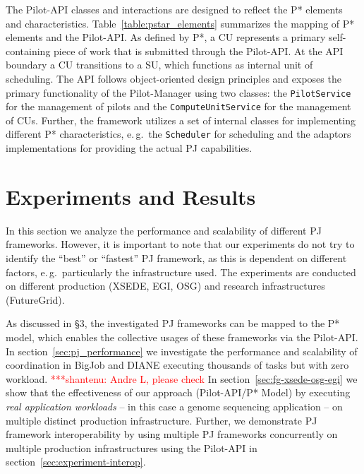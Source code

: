 \documentclass[conference,final]{IEEEtran}
\newcommand{\jhanote}[1]{ {\textcolor{red} { ***shantenu: #1 }}}
\newcommand{\jhanote}[1]{}
\newcommand{\cu}{CU\xspace}
\newcommand{\cus}{CUs\xspace}
\newcommand{\upp}{\vspace*{-0.5em}}
\begin{document}
The Pilot-API classes and interactions are designed to reflect the P*
elements and characteristics.
Table~\ref{table:pstar_elements} summarizes the mapping of P* elements and the
Pilot-API. As defined by P*, a \cu represents a primary self-containing piece
of work that is submitted through the Pilot-API. 
At the API boundary a \cu transitions to a SU, which functions as internal unit
of scheduling.
The API follows object-oriented design principles and exposes the primary
functionality of the Pilot-Manager using two classes: the
\texttt{PilotService} for the management of pilots and the
\texttt{ComputeUnitService} for the management of \cus. 
Further, the framework utilizes a set of internal classes for implementing
different P* characteristics, e.\,g.\ the \texttt{Scheduler} for scheduling and
the adaptors implementations for providing the actual PJ capabilities.


\section{Experiments and Results\upp\upp}
\label{sec:exp_res}

In this section we analyze the performance and scalability of
different PJ frameworks.  However, it is important to note that our
experiments do not try to identify the ``best'' or ``fastest'' PJ
framework, as this is dependent on different factors,
e.\,g.\ particularly the infrastructure used.  The experiments are
conducted on different production (XSEDE, EGI, OSG) and research
infrastructures (FutureGrid). 

As discussed in \S3, the investigated PJ frameworks can be mapped to
the P* model, which enables the collective usages of these frameworks
via the Pilot-API.  In section~\ref{sec:pj_performance} we investigate
the performance and scalability of coordination in BigJob and DIANE
executing thousands of tasks but with zero workload. \jhanote{Andre L,
  please check} In section~\ref{sec:fg-xsede-osg-egi} we show that the
effectiveness of our approach (Pilot-API/P* Model) by executing {\it
  real application workloads} -- in this case a genome sequencing
application -- on multiple distinct production infrastructure.
Further, we demonstrate PJ framework interoperability by using
multiple PJ frameworks concurrently on multiple production
infrastructures using the Pilot-API in section~\ref{sec:experiment-interop}.
\end{document}
